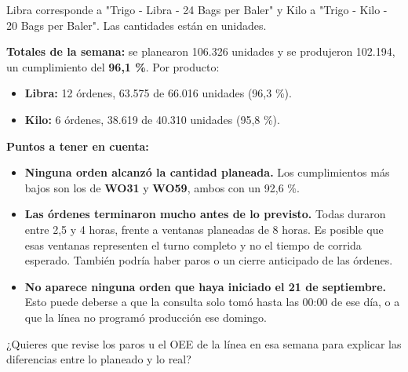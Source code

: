 \begin{singlespace}
{Libra corresponde a "Trigo - Libra - 24 Bags per Baler" y Kilo a "Trigo - Kilo - 20 Bags per Baler". Las cantidades están en unidades.



\textbf{Totales de la semana:} se planearon 106.326 unidades y se produjeron 102.194, un cumplimiento del \textbf{96,1 \%}. Por producto:

\begin{itemize}[leftmargin=1.2em,itemsep=0pt,topsep=2pt]
\item \textbf{Libra:} 12 órdenes, 63.575 de 66.016 unidades (96,3 \%).
\item \textbf{Kilo:} 6 órdenes, 38.619 de 40.310 unidades (95,8 \%).
\end{itemize}



\textbf{Puntos a tener en cuenta:}

\begin{itemize}[leftmargin=1.2em,itemsep=0pt,topsep=2pt]
\item \textbf{Ninguna orden alcanzó la cantidad planeada.} Los cumplimientos más bajos son los de \textbf{WO31} y \textbf{WO59}, ambos con un 92,6 \%.
\item \textbf{Las órdenes terminaron mucho antes de lo previsto.} Todas duraron entre 2,5 y 4 horas, frente a ventanas planeadas de 8 horas. Es posible que esas ventanas representen el turno completo y no el tiempo de corrida esperado. También podría haber paros o un cierre anticipado de las órdenes.
\item \textbf{No aparece ninguna orden que haya iniciado el 21 de septiembre.} Esto puede deberse a que la consulta solo tomó hasta las 00:00 de ese día, o a que la línea no programó producción ese domingo.
\end{itemize}



¿Quieres que revise los paros u el OEE de la línea en esa semana para explicar las diferencias entre lo planeado y lo real?}

\end{singlespace}
